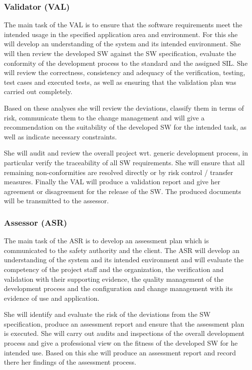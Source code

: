 \subsubsection{Validator (VAL)}
\label{sec:validator}

The main task of the VAL is to ensure that the software requirements meet the
intended usage in the specified application area and environment. For this she
will develop an understanding of the system and its intended environment. She
will then review the developed SW against the SW specification, evaluate the
conformity of the development process to the standard and the assigned SIL. She
will review the correctness, consistency and adequacy of the verification,
testing, test cases and executed tests, as well as ensuring that the validation
plan was carried out completely.

Based on these analyses she will review the deviations, classify them in terms
of risk, communicate them to the change management and will give a
recommendation on the suitability of the developed SW for the intended task, as
well as indicate necessary constraints.

She will audit and review the overall project wrt. generic development process,
in particular verify the traceability of all SW requirements. She will ensure
that all remaining non-conformities are resolved directly or by risk control /
transfer measures. Finally the VAL will produce a validation report and give her
agreement or disagreement for the release of the SW. The produced documents will
be transmitted to the assessor.

\subsubsection{Assessor (ASR)}
\label{sec:assessor}

The main task of the ASR is to develop an assessment plan which is communicated
to the safety authority and the client. The ASR will develop an understanding of
the system and its intended environment and will evaluate the competency of the
project staff and the organization, the verification and validation with their
supporting evidence, the quality management of the development process and the
configuration and change management with its evidence of use and application.

She will identify and evaluate the risk of the deviations from the SW
specification, produce an assessment report and ensure that the assessment plan
is executed. She will carry out audits and inspections of the overall
development process and give a professional view on the fitness of the developed
SW for he intended use. Based on this she will produce an assessment report and
record there her findings of the assessment process.

